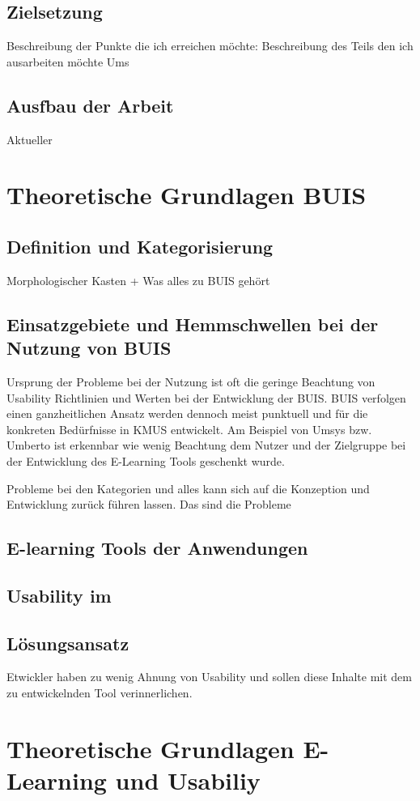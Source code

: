 \documentclass[a4paper, 12pt, twoside, BCOR=20mm, DIV=calc, abstracton, parskip=half*, toc=bibliography, toc=listof, headsepline, headings=small, numbers=enddot]{scrreprt} %
\begin{document}
\section{Zielsetzung}
Beschreibung der Punkte die ich erreichen möchte:
Beschreibung des Teils den ich ausarbeiten möchte
Ums
\section{Ausfbau der Arbeit}
Aktueller
\chapter{Theoretische Grundlagen BUIS}
\section{Definition und Kategorisierung}
Morphologischer Kasten + Was alles zu BUIS gehört
\section{Einsatzgebiete und Hemmschwellen bei der Nutzung von BUIS}
Ursprung der Probleme bei der Nutzung ist oft die geringe Beachtung von Usability Richtlinien und Werten bei der Entwicklung der BUIS. 
BUIS verfolgen einen ganzheitlichen Ansatz werden dennoch meist punktuell und für die konkreten Bedürfnisse in KMUS entwickelt. 
Am Beispiel von Umsys bzw. Umberto ist erkennbar wie wenig Beachtung dem Nutzer und der Zielgruppe bei der Entwicklung des E-Learning Tools geschenkt wurde. 

Probleme bei den Kategorien und alles kann sich auf die Konzeption und Entwicklung zurück führen lassen.
Das sind die Probleme
\section{E-learning Tools der Anwendungen}
\section{Usability im  }

\section{Lösungsansatz}
Etwickler haben zu wenig Ahnung von Usability und sollen diese Inhalte mit dem zu entwickelnden Tool verinnerlichen. 

\chapter{Theoretische Grundlagen E-Learning und Usabiliy}
\end{document}
